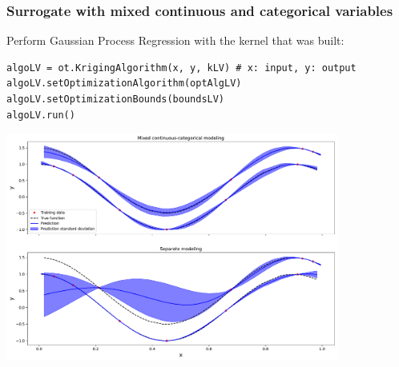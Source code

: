 \documentclass{beamer}
\begin{document}
\begin{frame}[containsverbatim]
  \frametitle{Surrogate with mixed continuous and categorical variables}
\small


Perform Gaussian Process Regression with the kernel that was built:
\begin{lstlisting}
algoLV = ot.KrigingAlgorithm(x, y, kLV) # x: input, y: output
algoLV.setOptimizationAlgorithm(optAlgLV)
algoLV.setOptimizationBounds(boundsLV)
algoLV.run()
\end{lstlisting}
\vspace{-0.2cm}
\centering
\includegraphics[width=0.82\textwidth]{figures/latent_variable_model.pdf}

\end{frame}



	
	
\end{document}
